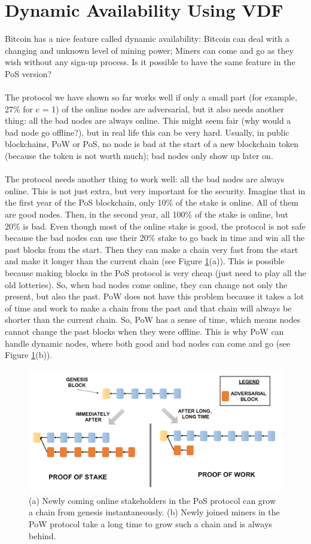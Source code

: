 \documentclass{report}
\begin{document}
\section{Dynamic Availability Using VDF}
Bitcoin has a nice feature called dynamic availability: Bitcoin can deal with a changing and unknown level of mining power; Miners can come and go as they wish without any sign-up process. Is it possible to have the same feature in the PoS version?\\\\
The protocol we have shown so far works well if only a small part (for example, 27\% for c = 1) of the online nodes are adversarial, but it also needs another thing: all the bad nodes are always online. This might seem fair (why would a bad node go offline?), but in real life this can be very hard. Usually, in public blockchains, PoW or PoS, no node is bad at the start of a new blockchain token (because the token is not worth much); bad nodes only show up later on.\\\\
The protocol needs another thing to work well: all the bad nodes are always online. This is not just extra, but very important for the security. Imagine that in the first year of the PoS blockchain, only 10\% of the stake is online. All of them are good nodes. Then, in the second year, all 100\% of the stake is online, but 20\% is bad. Even though most of the online stake is good, the protocol is not safe because the bad nodes can use their 20\% stake to go back in time and win all the past blocks from the start. Then they can make a chain very fast from the start and make it longer than the current chain (see Figure \ref{fig:f9}(a)). This is possible because making blocks in the PoS protocol is very cheap (just need to play all the old lotteries). So, when bad nodes come online, they can change not only the present, but also the past. PoW does not have this problem because it takes a lot of time and work to make a chain from the past and that chain will always be shorter than the current chain. So, PoW has a sense of time, which means nodes cannot change the past blocks when they were offline. This is why PoW can handle dynamic nodes, where both good and bad nodes can come and go (see Figure \ref{fig:f9}(b)).
\begin{figure}[h!]
	\centering
	\includegraphics[width=0.7\linewidth]{Fig/F9}
	\caption{(a) Newly coming online stakeholders in the PoS protocol can grow a chain from genesis
		instantaneously. (b) Newly joined miners in the PoW protocol take a long time to grow such a chain
		and is always behind.}
	\label{fig:f9}
\end{figure}
\end{document}
